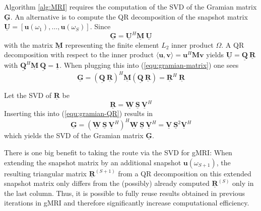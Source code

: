 \documentclass[11pt, a4paper]{article}
\begin{document}
Algorithm \ref{alg:MRI} requires the computation of the \acrfull{SVD}
of the Gramian matrix $\mathbf{\underline{G}}$. An alternative is to compute
the QR decomposition of the snapshot matrix $\mathbf{\underline{U}} = [\mathbf{u}(\omega_1), \dots, \mathbf{u}(\omega_S)]$.
Since
\begin{equation}
    \mathbf{\underline{G}} = \mathbf{\underline{U}}^H \mathbf{\underline{M}}~\mathbf{\underline{U}} \label{equ:gramian-matrix}
\end{equation}
with the matrix $\mathbf{\underline{M}}$ representing the finite element 
$L_2$ inner product $\Omega$. A QR decomposition with respect to the inner product
$\langle \mathbf{u}, \mathbf{v} \rangle = \mathbf{u}^H \mathbf{M} \mathbf{v}$
yields $\mathbf{\underline{U}} = \mathbf{\underline{Q}}~\mathbf{\underline{R}}$
with $\mathbf{\underline{Q}}^H \mathbf{\underline{M}}~\mathbf{\underline{Q}} = \boldsymbol{\underline{1}}$.
When plugging this into (\ref{equ:gramian-matrix}) one sees
\begin{equation}
    \mathbf{\underline{G}} = (\mathbf{\underline{Q}}~\mathbf{\underline{R}})^H \mathbf{\underline{M}} 
    (\mathbf{\underline{Q}}~\mathbf{\underline{R}}) = \mathbf{\underline{R}}^H~\mathbf{\underline{R}}
    \label{equ:gramian-QR}
\end{equation}

Let the \acrshort{SVD} of $\mathbf{\underline{R}}$ be 
\begin{equation}
    \mathbf{\underline{R}} = \mathbf{\underline{W}}~\mathbf{\underline{S}}~\mathbf{\underline{V}}^H \label{equ:qr-decomposition}
\end{equation}
Inserting this into (\ref{equ:gramian-QR}) results in
\begin{equation}
    \mathbf{\underline{G}} = (\mathbf{\underline{W}}~\mathbf{\underline{S}}~\mathbf{\underline{V}}^H)^H \mathbf{\underline{W}}~\mathbf{\underline{S}}~\mathbf{\underline{V}}^H
    = \mathbf{\underline{V}}~\mathbf{\underline{S}}^2\mathbf{\underline{V}}^H
    \label{equ:gramian-SVD}
\end{equation}
which yields the \acrshort{SVD} of the Gramian matrix $\mathbf{\underline{G}}$.

There is one big benefit to taking the route via the \acrshort{SVD}
for \acrshort{gMRI}: When extending the snapshot matrix by an additional
snapshot $\mathbf{u}(\omega_{S+1})$, the resulting triangular matrix $\mathbf{\underline{R}}^{(S+1)}$
from a QR decomposition on this extended snapshot matrix only differs from the 
(possibly) already computed $\mathbf{\underline{R}}^{(S)}$ only in the last column.
Thus, it is possible to fully reuse results obtained in previous iterations in
\acrshort{gMRI} and therefore significantly increase computational efficiency.
\end{document}
